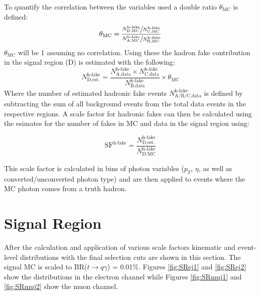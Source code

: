 To quantify the correlation between the variables used a double ratio $\theta_{\text{MC}}$ is defined:
\[\theta_{\text{MC}}=\frac
{\sfrac{N_\text{D,MC}^{\text{h-fake}}}{N_\text{C,MC}^{\text{h-fake}}}}
{\sfrac{N_\text{A,MC}^{\text{h-fake}}}{N_\text{B,MC}^{\text{h-fake}}}}
\]
$\theta_\text{MC}$ will be 1 assuming no correlation.  Using these the hadron fake contribution in the signal region (D) is estimated with the following:
\[N_\text{D,est.}^{\text{h-fake}} = \frac{N_\text{A,data}^{\text{h-fake}}\times N_\text{C,data}^{\text{h-fake}}}{N_\text{B,data}^{\text{h-fake}}}\times \theta_\text{MC}
\]
Where the number of estimated hadronic fake events $N_\text{A/B/C,data}^\text{h-fake}$ is defined by subtracting the sum of all background events from the total data events in the respective regions.  A scale factor for hadronic fakes can then be calculated using the esimates for the number of fakes in MC and data in the signal region using:

\[\text{SF}^\text{h-fake} = \frac{N^\text{h-fake}_\text{D,est.}}{N^\text{h-fake}_\text{D,MC}}
\]

This scale factor is calculated in bins of photon variables ($p_T$, $\eta$, as well as converted/unconverted photon type) and are then applied to events where the MC photon comes from a truth hadron.



\section{Signal Region}

After the calculation and application of various scale factors kinematic and event-level distributions with the final selection cuts are shown in this section.  The signal MC is scaled to BR($t\rightarrow q\gamma$) = 0.01\%.  Figures \ref{fig:SRej1} and \ref{fig:SRej2} show the distributions in the electron channel while Figures \ref{fig:SRmuj1} and \ref{fig:SRmuj2} show the muon channel.  %

